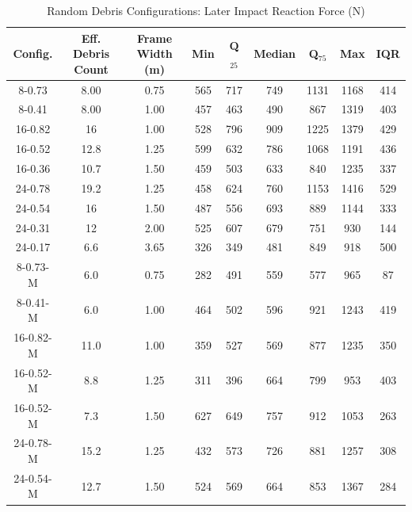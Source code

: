 \documentclass[10pt,a4paper]{article}
\begin{document}
\begin{table}[H]
\centering
\caption{Random Debris Configurations: Later Impact Reaction Force (N)}
\label{tab:data-ran-LI} 
\begin{tabular}{ccccccccc}
\toprule
\textbf{Config.} & \textbf{Eff. Debris Count} & \textbf{Frame Width (m)} & \textbf{Min} & \textbf{Q$_{25}$} & \textbf{Median} & \textbf{Q$_{75}$} & \textbf{Max} & \textbf{IQR} \\
\midrule
8-0.73     & 8.00   & 0.75 & 565 & 717 & 749 & 1131 & 1168 & 414 \\
8-0.41     & 8.00   & 1.00 & 457 & 463 & 490 & 867  & 1319 & 403 \\
16-0.82    & 16     & 1.00 & 528 & 796 & 909 & 1225 & 1379 & 429 \\
16-0.52    & 12.8   & 1.25 & 599 & 632 & 786 & 1068 & 1191 & 436 \\
16-0.36    & 10.7   & 1.50 & 459 & 503 & 633 & 840  & 1235 & 337 \\
24-0.78    & 19.2   & 1.25 & 458 & 624 & 760 & 1153 & 1416 & 529 \\
24-0.54    & 16     & 1.50 & 487 & 556 & 693 & 889  & 1144 & 333 \\
24-0.31    & 12     & 2.00 & 525 & 607 & 679 & 751  & 930  & 144 \\
24-0.17    & 6.6    & 3.65 & 326 & 349 & 481 & 849  & 918  & 500 \\
8-0.73-M   & 6.0    & 0.75 & 282 & 491 & 559 & 577  & 965  & 87  \\
8-0.41-M   & 6.0    & 1.00 & 464 & 502 & 596 & 921  & 1243 & 419 \\
16-0.82-M  & 11.0   & 1.00 & 359 & 527 & 569 & 877  & 1235 & 350 \\
16-0.52-M  & 8.8    & 1.25 & 311 & 396 & 664 & 799  & 953  & 403 \\
16-0.52-M  & 7.3    & 1.50 & 627 & 649 & 757 & 912  & 1053 & 263 \\
24-0.78-M  & 15.2   & 1.25 & 432 & 573 & 726 & 881  & 1257 & 308 \\
24-0.54-M  & 12.7   & 1.50 & 524 & 569 & 664 & 853  & 1367 & 284 \\
\bottomrule
\end{tabular}
\end{table}
\end{document}

